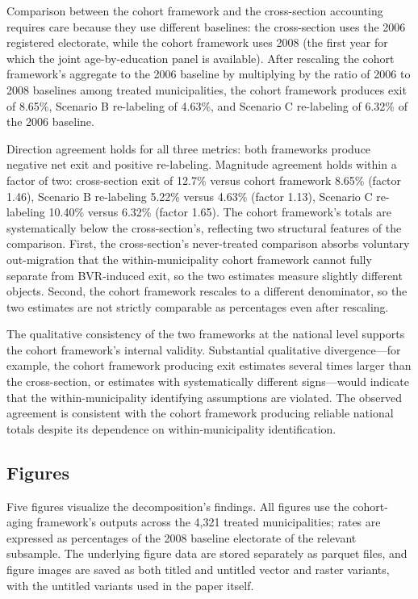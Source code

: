Comparison between the cohort framework and the cross-section accounting requires care because they use different baselines: the cross-section uses the 2006 registered electorate, while the cohort framework uses 2008 (the first year for which the joint age-by-education panel is available). After rescaling the cohort framework's aggregate to the 2006 baseline by multiplying by the ratio of 2006 to 2008 baselines among treated municipalities, the cohort framework produces exit of 8.65\%, Scenario B re-labeling of 4.63\%, and Scenario C re-labeling of 6.32\% of the 2006 baseline.

Direction agreement holds for all three metrics: both frameworks produce negative net exit and positive re-labeling. Magnitude agreement holds within a factor of two: cross-section exit of 12.7\% versus cohort framework 8.65\% (factor 1.46), Scenario B re-labeling 5.22\% versus 4.63\% (factor 1.13), Scenario C re-labeling 10.40\% versus 6.32\% (factor 1.65). The cohort framework's totals are systematically below the cross-section's, reflecting two structural features of the comparison. First, the cross-section's never-treated comparison absorbs voluntary out-migration that the within-municipality cohort framework cannot fully separate from BVR-induced exit, so the two estimates measure slightly different objects. Second, the cohort framework rescales to a different denominator, so the two estimates are not strictly comparable as percentages even after rescaling.

The qualitative consistency of the two frameworks at the national level supports the cohort framework's internal validity. Substantial qualitative divergence---for example, the cohort framework producing exit estimates several times larger than the cross-section, or estimates with systematically different signs---would indicate that the within-municipality identifying assumptions are violated. The observed agreement is consistent with the cohort framework producing reliable national totals despite its dependence on within-municipality identification.

\subsection{Figures}
\label{ssec:decomposition_figures}

Five figures visualize the decomposition's findings. All figures use the cohort-aging framework's outputs across the 4{,}321 treated municipalities; rates are expressed as percentages of the 2008 baseline electorate of the relevant subsample. The underlying figure data are stored separately as parquet files, and figure images are saved as both titled and untitled vector and raster variants, with the untitled variants used in the paper itself.

